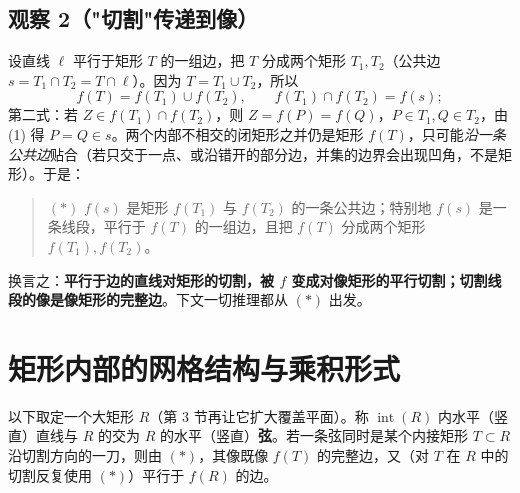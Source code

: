 \documentclass[12pt,a4paper]{ctexart}
\theoremstyle{ding}
\theoremstyle{definition}
\renewcommand{\int}{\operatorname{int}}
\begin{document}
\subsection*{观察 2（"切割"传递到像）}
设直线 $\ell$ 平行于矩形 $T$ 的一组边，把 $T$ 分成两个矩形 $T_1,T_2$（公共边 $s=T_1\cap T_2=T\cap\ell$）。因为 $T=T_1\cup T_2$，所以
\[
f(T)=f(T_1)\cup f(T_2),\qquad f(T_1)\cap f(T_2)=f(s);
\]
第二式：若 $Z\in f(T_1)\cap f(T_2)$，则 $Z=f(P)=f(Q)$，$P\in T_1,Q\in T_2$，由 (1) 得 $P=Q\in s$。两个内部不相交的闭矩形之并仍是矩形 $f(T)$，只可能\emph{沿一条公共边}贴合（若只交于一点、或沿错开的部分边，并集的边界会出现凹角，不是矩形）。于是：
\begin{quote}
$(*)$ $f(s)$ 是矩形 $f(T_1)$ 与 $f(T_2)$ 的一条公共边；特别地 $f(s)$ 是一条线段，平行于 $f(T)$ 的一组边，且把 $f(T)$ 分成两个矩形 $f(T_1),f(T_2)$。
\end{quote}
换言之：\textbf{平行于边的直线对矩形的切割，被 $f$ 变成对像矩形的平行切割；切割线段的像是像矩形的完整边}。下文一切推理都从 $(*)$ 出发。

\section{矩形内部的网格结构与乘积形式}
以下取定一个大矩形 $R$（第 3 节再让它扩大覆盖平面）。称 $\int(R)$ 内水平（竖直）直线与 $R$ 的交为 $R$ 的水平（竖直）\textbf{弦}。若一条弦同时是某个内接矩形 $T\subset R$ 沿切割方向的一刀，则由 $(*)$，其像既像 $f(T)$ 的完整边，又（对 $T$ 在 $R$ 中的切割反复使用 $(*)$）平行于 $f(R)$ 的边。
\end{document}
